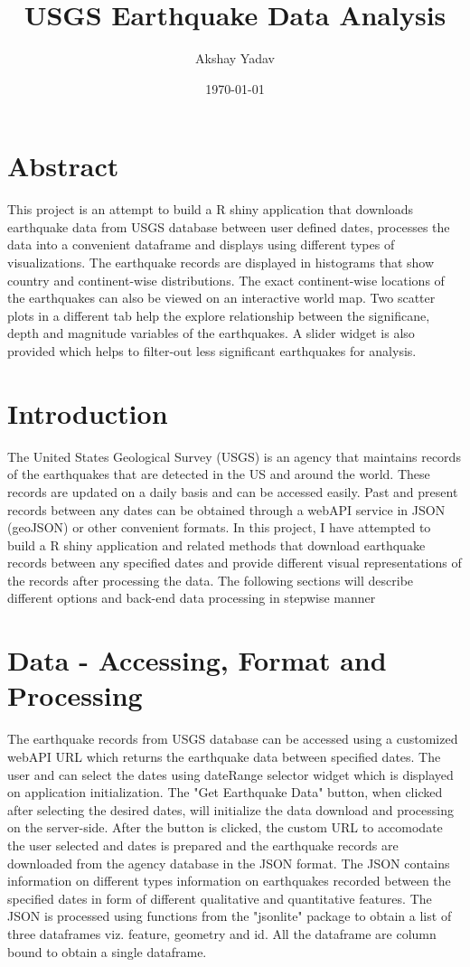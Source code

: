 \documentclass{article}
\title{USGS Earthquake Data Analysis}
\date{\today}
\author{Akshay Yadav}
\begin{document}
	\maketitle
	\section{Abstract}
		This project is an attempt to build a R shiny application that downloads earthquake data from USGS database between user defined dates, processes the data into a convenient dataframe and displays using different types of visualizations. The earthquake records are displayed in histograms that show country and continent-wise distributions. The exact continent-wise locations of the earthquakes can also be viewed on an interactive world map. Two scatter plots in a different tab help the explore relationship between the significane, depth and magnitude variables of the earthquakes. A slider widget is also provided which helps to filter-out less significant earthquakes for analysis. 
		
	\section{Introduction}
		The United States Geological Survey (USGS) is an agency that maintains records of the earthquakes that are detected in the US and around the world. These records are updated on a daily basis and can be accessed easily. Past and present records between any dates can be obtained through a webAPI service in JSON (geoJSON) or other convenient formats. In this project, I have attempted to build a R shiny application and related methods that download earthquake records between any specified dates and provide different visual representations of the records after processing the data. The following sections will describe different options and back-end data processing in stepwise manner
	
	\section{Data - Accessing, Format and Processing}
		The earthquake records from USGS database can be accessed using a customized webAPI URL which returns the earthquake data between specified dates. The user and can select the dates using dateRange selector widget which is displayed on application initialization. The "Get Earthquake Data" button, when clicked after selecting the desired dates, will initialize the data download and processing on the server-side. After the button is clicked, the custom URL to accomodate the user selected and dates is prepared and the earthquake records are downloaded from the agency database in the JSON format. The JSON contains information on different types information on earthquakes recorded between the specified dates in form of different qualitative and quantitative features. The JSON is processed using functions from the "jsonlite" package to obtain a list of three dataframes viz. feature, geometry and id. All the dataframe are column bound to obtain a single dataframe.
		
\end{document}

